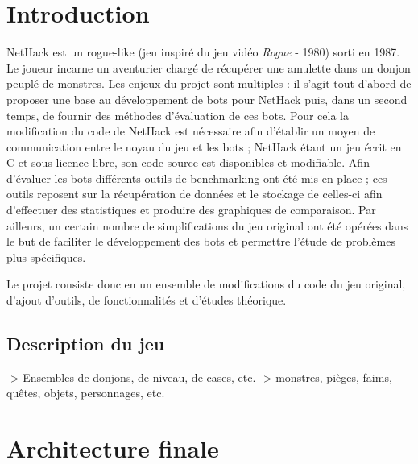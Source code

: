 \documentclass[a4paper,12pt]{article}
\begin{document}
\tableofcontents
\pagebreak

\section{Introduction}

NetHack est un rogue-like (jeu inspiré du jeu vidéo \emph{Rogue} - 1980)
sorti en 1987. Le joueur incarne un aventurier chargé de récupérer une
amulette dans un donjon peuplé de monstres.
Les enjeux du projet sont multiples : il s'agit tout d'abord de proposer une
base au développement de bots pour NetHack puis, dans un second temps, de
fournir des méthodes d'évaluation de ces bots. Pour cela la modification du code
de NetHack est nécessaire afin d'établir un moyen de communication entre le
noyau du jeu et les bots ; NetHack étant un jeu écrit en C et sous licence
libre, son code source est disponibles et modifiable. Afin d'évaluer les bots
différents outils de benchmarking ont été mis en place ; ces outils reposent
sur la récupération de données et le stockage de celles-ci afin d'effectuer
des statistiques et produire des graphiques de comparaison.
Par ailleurs, un certain nombre de simplifications du jeu original ont été
opérées dans le but de faciliter le développement des bots et permettre
l'étude de problèmes plus spécifiques.  

Le projet consiste donc en un ensemble de modifications du code du jeu
original, d'ajout d'outils, de fonctionnalités et d'études théorique.

\subsection*{Description du jeu}
-> Ensembles de donjons, de niveau, de cases, etc.
-> monstres, pièges, faims, quêtes, objets, personnages, etc.

\section{Architecture finale}
\end{document}
